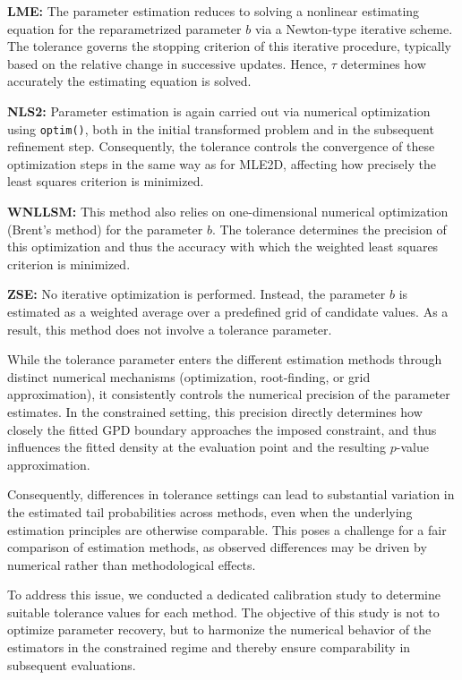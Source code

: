 \textbf{LME:} The parameter estimation reduces to solving a nonlinear estimating equation for the reparametrized parameter $b$ via a Newton-type iterative scheme. The tolerance governs the stopping criterion of this iterative procedure, typically based on the relative change in successive updates. Hence, $\tau$ determines how accurately the estimating equation is solved.

\textbf{NLS2:} Parameter estimation is again carried out via numerical optimization using \texttt{optim()}, both in the initial transformed problem and in the subsequent refinement step. Consequently, the tolerance controls the convergence of these optimization steps in the same way as for MLE2D, affecting how precisely the least squares criterion is minimized.

\textbf{WNLLSM:} This method also relies on one-dimensional numerical optimization (Brent’s method) for the parameter $b$. The tolerance determines the precision of this optimization and thus the accuracy with which the weighted least squares criterion is minimized.

\textbf{ZSE:} No iterative optimization is performed. Instead, the parameter $b$ is estimated as a weighted average over a predefined grid of candidate values. As a result, this method does not involve a tolerance parameter.

While the tolerance parameter enters the different estimation methods through distinct numerical mechanisms (optimization, root-finding, or grid approximation), it consistently controls the numerical precision of the parameter estimates. In the constrained setting, this precision directly determines how closely the fitted GPD boundary approaches the imposed constraint, and thus influences the fitted density at the evaluation point and the resulting $p$-value approximation.

Consequently, differences in tolerance settings can lead to substantial variation in the estimated tail probabilities across methods, even when the underlying estimation principles are otherwise comparable. This poses a challenge for a fair comparison of estimation methods, as observed differences may be driven by numerical rather than methodological effects.

To address this issue, we conducted a dedicated calibration study to determine suitable tolerance values for each method. The objective of this study is not to optimize parameter recovery, but to harmonize the numerical behavior of the estimators in the constrained regime and thereby ensure comparability in subsequent evaluations.

